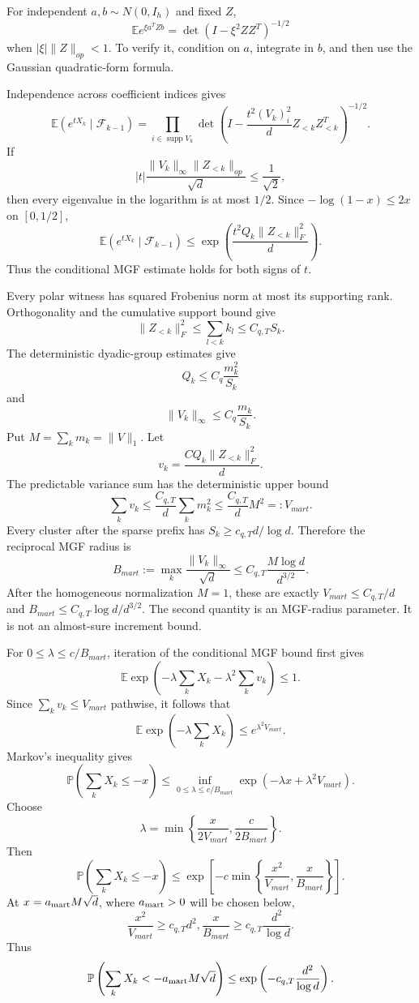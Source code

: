 \documentclass[11pt]{article}
\numberwithin{equation}{section}
\theoremstyle{definition}
\theoremstyle{remark}
\newcommand{\E}{\mathbb E}
\newcommand{\Pp}{\mathbb P}
\newcommand{\1}{\boldsymbol 1}
\begin{document}
\begin{aiblock}
For independent $a,b\sim N(0,I_h)$ and fixed $Z$,
\[
  \E e^{\xi a^TZb}=\det(I-\xi^2ZZ^T)^{-1/2}
\]
when $|\xi|\|Z\|_{op}<1$. To verify it, condition on $a$,
integrate in $b$, and then use the Gaussian
quadratic-form formula.

Independence across coefficient indices gives
\[
  \E(e^{tX_k}\mid\mathcal{F}_{k-1}) = \prod_{i\in
  \operatorname{supp}V_k} \det\left(I-\frac{t^2(V_k)_i^2}
  {d}Z_{<k}Z_{<k}^T\right)^{-1/2}.
\]
If
\[
  |t|\frac{\|V_k\|_\infty\|Z_{<k}\|_{op}}{\sqrt d}\le
  \frac1{\sqrt2},
\]
then every eigenvalue in the logarithm is at most
$1/2$. Since $-\log(1-x)\le2x$ on $[0,1/2]$,
\[
  \E(e^{tX_k}\mid\mathcal{F}_{k-1}) \le
  \exp\left(\frac{t^2Q_k\|Z_{<k}\|_F^2}{d}\right).
\]
Thus the conditional MGF estimate holds for both signs
of $t$.

Every polar witness has squared Frobenius norm at most
its supporting rank. Orthogonality and the cumulative
support bound give
\[
  \|Z_{<k}\|_F^2 \le \sum_{l<k}k_l \le C_{q,T}S_k.
\]
The deterministic dyadic-group estimates give
\[
  Q_k\le C_q\frac{m_k^2}{S_k}
\]
and
\[
  \|V_k\|_\infty\le C_q\frac{m_k}{S_k}.
\]
Put $M=\sum_km_k=\|V\|_1$. Let
\[
  v_k=\frac{CQ_k\|Z_{<k}\|_F^2}{d}.
\]
The predictable variance sum has the deterministic upper
bound
\[
  \sum_kv_k \le \frac{C_{q,T}}d\sum_km_k^2 \le
  \frac{C_{q,T}}dM^2=:V_{mart}.
\]
Every cluster after the sparse prefix has $S_k\ge
c_{q,T}d/\log d$. Therefore the reciprocal MGF radius is
\[
  B_{mart}:=\max_k\frac{\|V_k\|_\infty}{\sqrt d} \le
  C_{q,T}\frac{M\log d}{d^{3/2}}.
\]
After the homogeneous normalization $M=1$, these are
exactly $V_{mart}\le C_{q,T}/d$ and $B_{mart}\le
C_{q,T}\log d/d^{3/2}$. The second quantity is an
MGF-radius parameter. It is not an almost-sure increment
bound.

For $0\le\lambda\le c/B_{mart}$, iteration of the
conditional MGF bound first gives
\[
  \E\exp\left(-\lambda\sum_kX_k-\lambda^2\sum_kv_k\right)
  \le1.
\]
Since $\sum_kv_k\le V_{mart}$ pathwise, it follows that
\[
  \E\exp\left(-\lambda\sum_kX_k\right)\le
  e^{\lambda^2V_{mart}}.
\]
Markov's inequality gives
\[
  \Pp\left(\sum_kX_k\le-x\right) \le
  \inf_{0\le\lambda\le c/B_{mart}}
  \exp(-\lambda x+\lambda^2V_{mart}).
\]
Choose
\[
  \lambda=\min\left\{\frac{x}{2V_{mart}},\frac{c}
  {2B_{mart}}\right\}.
\]
Then
\[
  \Pp\left(\sum_kX_k\le-x\right) \le
  \exp\left[-c\min\left\{\frac{x^2}{V_{mart}},
  \frac{x}{B_{mart}}\right\}\right].
\]
At $x=a_{\rm mart}M\sqrt d$, where $a_{\rm mart}>0$ will
be chosen below,
\[
  \frac{x^2}{V_{mart}}\ge c_{q,T}d^2,
  \frac{x}{B_{mart}}\ge c_{q,T}\frac{d^2}{\log d}.
\]
Thus
\[
  \Pp\left(\sum_kX_k<-a_{\rm mart}M\sqrt d\right) \le
  \exp\left(-c_{q,T}\frac{d^2}{\log d}\right).
\]


\end{aiblock}
\end{document}
